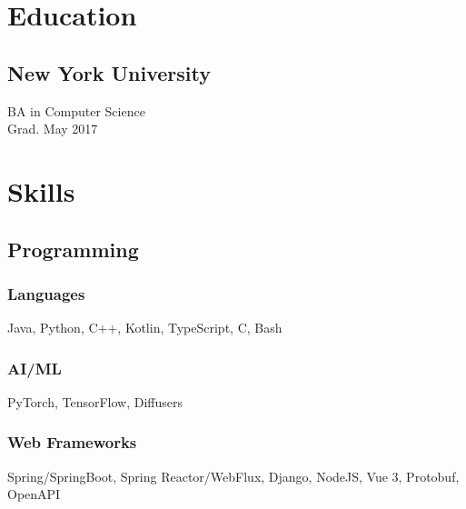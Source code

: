 \documentclass[]{two-column-resume}
\begin{document}
\begin{minipage}[t]{0.34\textwidth}

%
\section{Education}

\subsection{New York University}
BA in Computer Science \\
Grad. May 2017 \\


    \sectionsep

%
\section{Skills}
\setlength{\parindent}{3ex}
\subsection{Programming}

    \subsubsection{Languages}
            Java, 
            Python, 
            C++, 
            Kotlin, 
            TypeScript, 
            C, 
            Bash
        \newline
    \subsubsection{AI/ML}
            PyTorch, 
            TensorFlow, 
            Diffusers
        \newline
    \subsubsection{Web Frameworks}
            Spring/SpringBoot, 
            Spring Reactor/WebFlux, 
            Django, 
            NodeJS, 
            Vue 3, 
            Protobuf, 
            OpenAPI
        \newline

\end{minipage}
\end{document}
